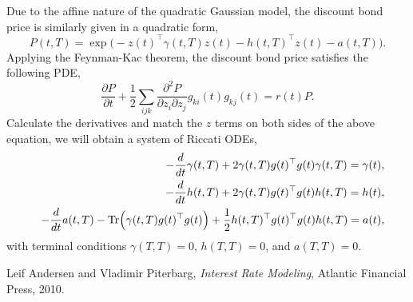 \documentclass[12pt]{article}
\begin{document}
  Due to the affine nature of the quadratic Gaussian model, the discount bond price is similarly given
  in a quadratic form,
  \begin{equation}
    P(t,T)=\exp\Big(-z(t)^{\top}\gamma(t,T)z(t)-h(t,T)^{\top}z(t)-a(t,T)\Big).
  \end{equation}
  Applying the Feynman-Kac theorem, the discount bond price satisfies the following PDE,
  \begin{equation}
    \frac{\partial P}{\partial t}+\frac{1}{2}\sum_{ijk}
    \frac{\partial^2P}{\partial z_i\partial z_j}g_{ki}(t)g_{kj}(t)=r(t)P.
  \end{equation}
  Calculate the derivatives and match the $z$ terms on both sides of the above equation, we will
  obtain a system of Riccati ODEs,
  \begin{eqnarray}
    && -\frac{d}{dt}\gamma(t,T) + 2\gamma(t,T)g(t)^{\top}g(t)\gamma(t,T)=\gamma(t),\\
    && -\frac{d}{dt}h(t,T) + 2\gamma(t,T)g(t)^{\top}g(t)h(t,T)=h(t),\\
    && -\frac{d}{dt}a(t,T) - {\rm Tr}\Big(\gamma(t,T)g(t)^{\top}g(t)\Big) + \frac{1}{2}h(t,T)^{\top}g(t)^{\top}g(t)h(t,T)=a(t),
  \end{eqnarray}
  with terminal conditions $\gamma(T,T)=0$, $h(T,T)=0$, and $a(T,T)=0$.



\begin{thebibliography}{1}

   Leif Andersen and Vladimir Piterbarg, {\it Interest Rate Modeling}, Atlantic Financial Press, 2010.

\end{thebibliography}
\end{document}
